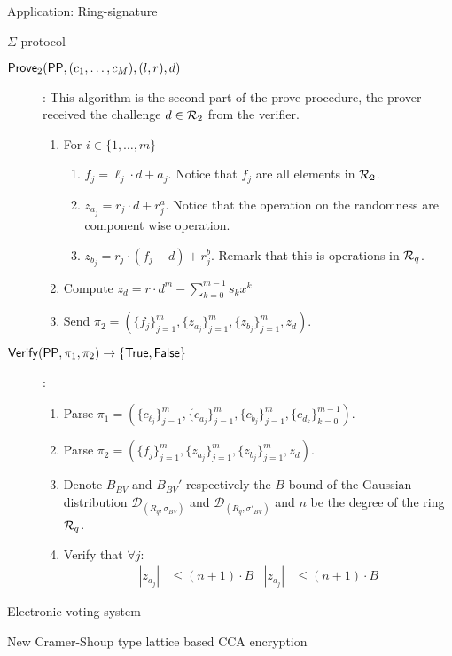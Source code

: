\begin{section}{Application: Ring-signature}
\begin{subsection}{$\Sigma$-protocol}
\begin{description}
        \item[${\mathsf{Prove}}_2({\mathsf{PP}}, (c_1, \dots, c_M), (l, r), d)$]: This algorithm is the second part of the prove procedure, the prover received the challenge $d \in {\mathcal{R}}_2$ from the verifier.
        \begin{enumerate}
          \item For $i \in \{1, \dots, m\}$
          \begin{enumerate}
            \item $f_j = \ell_j \cdot d + a_j$. Notice that $f_j$ are all elements in ${\mathcal{R}}_2$.
            \item $z_{a_j} = r_j \cdot d + r^a_j$. Notice that the operation on the randomness are component wise operation.
            \item $z_{b_j} = r_j \cdot (f_j - d) + r^b_j$. Remark that this is operations in ${\mathcal{R}}_q$.
          \end{enumerate}
          \item Compute $z_d = r \cdot d^m - \sum_{k = 0}^{m-1}s_k x^k$
          \item Send $\pi_2 = (\{f_j\}_{j = 1}^m, \{z_{a_j}\}_{j = 1}^m, \{z_{b_j}\}_{j = 1}^m, z_d)$.
        \end{enumerate}



        \item [${\mathsf{Verify}}({\mathsf{PP}}, \pi_1, \pi_2) \to \{\mathsf{True}, \mathsf{False}\}$]:
        \begin{enumerate}
          \item Parse $\pi_1 = (\{c_{\ell_j}\}_{j = 1}^m, \{c_{a_j}\}_{j = 1}^m,\{c_{b_j}\}_{j = 1}^m,\{c_{d_k}\}_{k = 0}^{m-1})$.
          \item Parse $\pi_2 = (\{f_j\}_{j = 1}^m, \{z_{a_j}\}_{j = 1}^m, \{z_{b_j}\}_{j = 1}^m, z_d)$.
          \item Denote $B_{BV}$ and $B_{BV}'$ respectively the $B$-bound of the Gaussian distribution $\mathcal{D}_{(R_q, \sigma_{BV})}$ and $\mathcal{D}_{(R_q, \sigma'_{BV})}$ and $n$ be the degree of the ring ${\mathcal{R}}_q$.
          \item Verify that $\forall j$:
          \begin{align*}
            |z_{a_j}| &\leq (n+1) \cdot B & |z_{a_j}| &\leq (n+1) \cdot B
          \end{align*}
        \end{enumerate}
    \end{description}
  \end{subsection}
\end{section}

\begin{section}{Electronic voting system}
\end{section}

\begin{section}{New Cramer-Shoup type lattice based CCA encryption}
\end{section}
